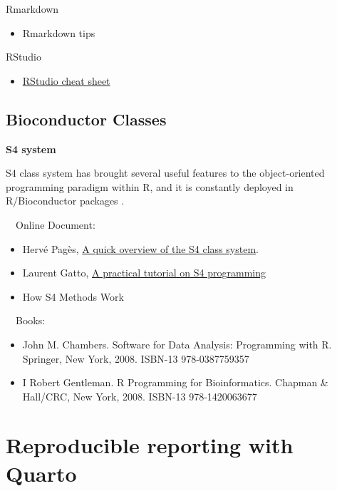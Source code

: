 \documentclass[
]{book}
\providecommand{\tightlist}{%
  \setlength{\itemsep}{0pt}\setlength{\parskip}{0pt}}
\begin{document}
Rmarkdown

\begin{itemize}
\tightlist
\item
  Rmarkdown tips \citep{Xie2020}
\end{itemize}

RStudio

\begin{itemize}
\tightlist
\item
  \href{https://www.rstudio.com/wp-content/uploads/2016/01/rstudio-IDE-cheatsheet.pdf}{RStudio cheat sheet}
\end{itemize}

\hypertarget{bioc_intro}{%
\subsection{Bioconductor Classes}\label{bioc_intro}}

\textbf{S4 system}

S4 class system has brought several useful features to the
object-oriented programming paradigm within R, and it is constantly
deployed in R/Bioconductor packages \citep{Huber2015}.

~~Online Document:

\begin{itemize}
\tightlist
\item
  Hervé Pagès, \href{https://bioconductor.org/packages/release/bioc/vignettes/S4Vectors/inst/doc/S4QuickOverview.pdf}{A quick overview of the S4 class system}.
\item
  Laurent Gatto, \href{https://bioconductor.org/help/course-materials/2013/CSAMA2013/friday/afternoon/S4-tutorial.pdf}{A practical tutorial on S4 programming}
\item
  How S4 Methods Work \citep{Chambers2006}
\end{itemize}

~~Books:

\begin{itemize}
\tightlist
\item
  John M. Chambers. Software for Data Analysis: Programming with R. Springer, New York, 2008. ISBN-13 978-0387759357 \citep{Chambers2008}
\item
  I Robert Gentleman. R Programming for Bioinformatics. Chapman \& Hall/CRC, New York, 2008. ISBN-13 978-1420063677 \citep{gentleman2008r}
\end{itemize}

\hypertarget{reproducible-reporting-with-quarto}{%
\section{Reproducible reporting with Quarto}\label{reproducible-reporting-with-quarto}}
\end{document}
